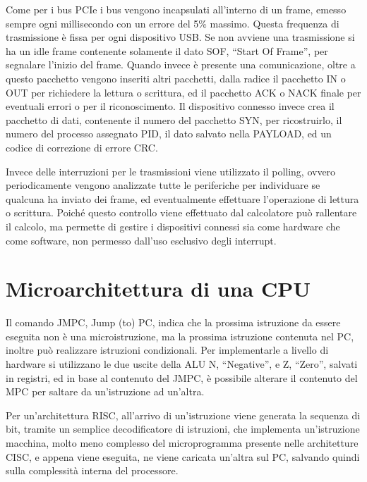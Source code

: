 \documentclass{article}
\numberwithin{equation}{subsection}
\begin{document}
Come per i bus PCIe i bus vengono incapsulati all'interno di un frame, emesso sempre ogni millisecondo con un errore del 5\% massimo. Questa frequenza di trasmissione è fissa per ogni dispositivo 
USB. Se non avviene una trasmissione si ha un idle frame contenente solamente il dato SOF, ``Start Of Frame'', per segnalare l'inizio del frame. Quando invece è presente una comunicazione, 
oltre a questo pacchetto vengono inseriti altri pacchetti, dalla radice il pacchetto IN o OUT per richiedere la lettura o scrittura, ed il pacchetto ACK o NACK finale per eventuali errori 
o per il riconoscimento. Il dispositivo connesso invece crea il pacchetto di dati, contenente il numero del pacchetto SYN, per ricostruirlo, il numero del processo assegnato PID, il dato 
salvato nella PAYLOAD, ed un codice di correzione di errore CRC. 

Invece delle interruzioni per le trasmissioni viene utilizzato il polling, ovvero periodicamente vengono analizzate tutte le periferiche per individuare se qualcuna ha inviato dei frame, 
ed eventualmente effettuare l'operazione di lettura o scrittura. Poiché questo controllo viene effettuato dal calcolatore può rallentare il calcolo, ma permette di gestire i dispositivi 
connessi sia come hardware che come software, non permesso dall'uso esclusivo degli interrupt. 

\clearpage

\section{Microarchitettura di una CPU}


Il comando JMPC, Jump (to) PC, indica che la prossima istruzione da essere eseguita non è una microistruzione, ma la prossima istruzione contenuta nel PC, inoltre 
può realizzare istruzioni condizionali. 
Per implementarle a livello di hardware si utilizzano le due uscite della ALU N, ``Negative'', e Z, ``Zero'', salvati in registri, ed in base al contenuto 
del JMPC, è possibile alterare il contenuto del MPC per saltare da un'istruzione ad un'altra. 


Per un'architettura RISC, all'arrivo di un'istruzione viene generata la sequenza di bit, tramite un semplice decodificatore di istruzioni, che implementa un'istruzione macchina, 
molto meno complesso del microprogramma presente nelle architetture CISC, e appena viene eseguita, ne viene caricata un'altra sul PC, salvando quindi sulla complessità interna 
del processore. 
\end{document}
